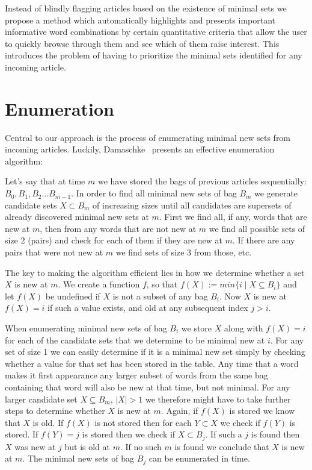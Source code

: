 Instead of blindly flagging articles based on the existence of minimal sets we propose a method which automatically highlights and presents important informative word combinations by certain quantitative criteria that allow the user to quickly browse through them and see which of them raise interest. This introduces the problem of having to prioritize the minimal sets identified for any incoming article.

\section{Enumeration}
\label{method:enumeration}
Central to our approach is the process of enumerating minimal new sets from incoming articles. Luckily, Damaschke~\cite{damaschke2015pairs} presents an effective enumeration algorithm:

Let's say that at time $m$ we have stored the bags of previous articles sequentially: $B_0, B_1, B_2...B_{m-1}$. In order to find all minimal new sets of bag $B_{m}$ we generate candidate sets $X \subset B_{m}$ of increasing sizes until all candidates are supersets of already discovered minimal new sets at $m$. First we find all, if any, words that are new at $m$, then from any words that are not new at $m$ we find all possible sets of size 2 (pairs) and check for each of them if they are new at $m$. If there are any pairs that were not new at $m$ we find sets of size 3 from those, etc. 

The key to making the algorithm efficient lies in how we determine whether a set $X$ is new at $m$. We create a function $f$, so that $f(X) := min\{i \mid X \subseteq B_{i}\}$ and let $f(X)$ be undefined if $X$ is not a subset of any bag $B_{i}$. Now $X$ is new at $f(X)=i$ if such a value exists, and old at any subsequent index $j>i$. 

When enumerating minimal new sets of bag $B_{i}$ we store $X$ along with $f(X)=i$ for each of the candidate sets that we determine to be minimal new at $i$. For any set of size 1 we can easily determine if it is a minimal new set simply by checking whether a value for that set has been stored in the table.  Any time that a word makes it first appearance any larger subset of words from the same bag containing that word will also be new at that time, but not minimal. For any larger candidate set $X \subseteq B_{m}$, $|X|>1$ we therefore might have to take further steps to determine whether $X$ is new at $m$. Again, if $f(X)$ is stored we know that $X$ is old. If $f(X)$ is not stored then for each $Y \subset X$ we check if $f(Y)$ is stored. If $f(Y)=j$ is stored then we check if $X \subset B_{j}$. If such a $j$ is found then $X$ was new at $j$ but is old at $m$. If no such $m$ is found we conclude that $X$ is new at $m$. The minimal new sets of bag $B_{j}$ can be enumerated in  time.


